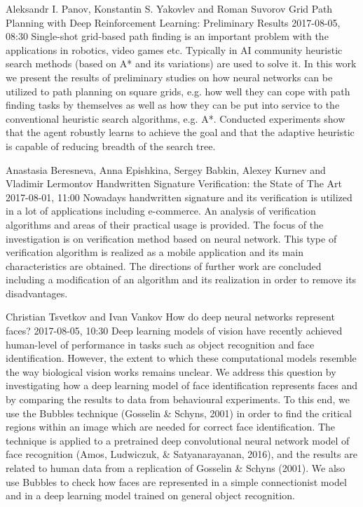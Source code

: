 \documentclass[10pt,fleqn,openany]{book} %
\begin{document}
\begin{enumerate}
		
		\paperabstract
		{Aleksandr I. Panov, Konstantin S. Yakovlev and Roman Suvorov}
		{Grid Path Planning with Deep Reinforcement Learning: Preliminary Results}
		{2017-08-05, 08:30}
		{Single-shot grid-based path finding is an important problem with the applications in robotics, video games etc. Typically in AI community heuristic search methods (based on A* and its variations) are used to solve it. In this work we present the results of preliminary studies on how neural networks can be utilized to path planning on square grids, e.g. how well they can cope with path finding tasks by themselves as well as how they can be put into service to the conventional heuristic search algorithms, e.g. A*. Conducted experiments show that the agent robustly learns to achieve the goal and that the adaptive heuristic is capable of reducing breadth of the search tree.}
		
		
		\paperabstract
		{Anastasia Beresneva, Anna Epishkina, Sergey Babkin, Alexey Kurnev and Vladimir Lermontov}
		{Handwritten Signature Verification: the State of The Art}
		{2017-08-01, 11:00}
		{Nowadays handwritten signature and its verification is utilized in a lot of applications including e-commerce. An analysis of verification algorithms and areas of their practical usage is provided. The focus of the investigation is on verification method based on neural network. This type of verification algorithm is realized as a mobile application and its main characteristics are obtained. The directions of further work are concluded including a modification of an algorithm and its realization in order to remove its disadvantages.}
		
		
		\paperabstract
		{Christian Tsvetkov and Ivan Vankov}
		{How do deep neural networks represent faces?}
		{2017-08-05, 10:30}
		{Deep learning models of vision have recently achieved human-level of performance in tasks such as object recognition and face identification. However, the extent to which these computational models resemble the way biological vision works remains unclear. We address this question by investigating how a deep learning model of face identification represents faces and by comparing the results to data from behavioural experiments. To this end, we use the Bubbles technique (Gosselin \& Schyns, 2001) in order to find the critical regions within an image which are needed for correct face identification. The technique is applied to a pretrained deep convolutional neural network model of face recognition (Amos, Ludwiczuk, \& Satyanarayanan, 2016), and the results are related to human data from a replication of Gosselin \& Schyns (2001). We also use Bubbles to check how faces are represented in a simple connectionist model and in a deep learning model trained on general object recognition.}
		

\end{enumerate}
\end{document}
